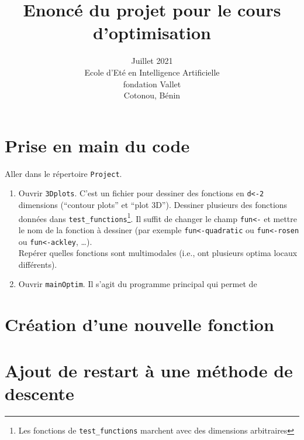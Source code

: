 \documentclass[12pt]{article}
\title{Enoncé du projet pour le cours d'optimisation}
\date{Juillet 2021 \\
Ecole d'Eté en Intelligence Artificielle \\
fondation Vallet\\
Cotonou, Bénin}
\author{}
\begin{document}
\maketitle

\section{Prise en main du code}
Aller dans le répertoire \texttt{Project}. 
\begin{enumerate}
\item Ouvrir \texttt{3Dplots}. C'est un fichier pour dessiner des fonctions en \texttt{d<-2} dimensions (``contour plots'' et ``plot 3D''). 
Dessiner plusieurs des fonctions données dans \texttt{test\_functions}\footnote{Les fonctions de \texttt{test\_functions} marchent avec des dimensions arbitraires}.
Il suffit de changer le champ \texttt{fun<-} et mettre le nom de la fonction à dessiner
(par exemple \texttt{fun<-quadratic} ou \texttt{fun<-rosen} ou \texttt{fun<-ackley}, \ldots). \\
Repérer quelles fonctions sont multimodales (i.e., ont plusieurs optima locaux différents).
\item Ouvrir \texttt{mainOptim}. Il s'agit du programme principal qui permet de 
\end{enumerate}
\section{Création d'une nouvelle fonction}
\section{Ajout de restart à une méthode de descente}
\end{document}
